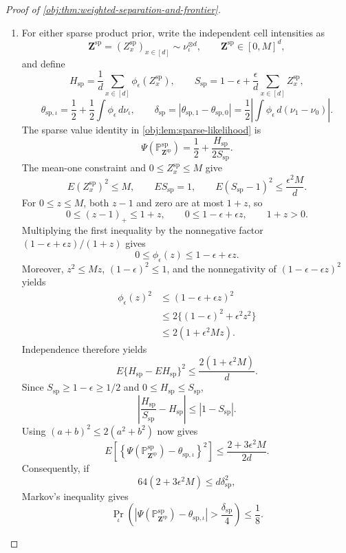 \documentclass[11pt]{article}
\begin{document}
\begin{proof}[Proof of \cref{obj:thm:weighted-separation-and-frontier}]
\begin{enumerate}
\item
For either sparse product prior, write the independent cell intensities as
\[
\mathbf Z^{\mathrm{sp}}
=(Z_x^{\mathrm{sp}})_{x\in[d]}
\sim\nu_\iota^{\otimes d},
\qquad
\mathbf Z^{\mathrm{sp}}\in[0,M]^d,
\]
and define
\[
H_{\mathrm{sp}}
=\frac1d\sum_{x\in[d]}\phi_\epsilon(Z_x^{\mathrm{sp}}),
\qquad
S_{\mathrm{sp}}
=1-\epsilon+\frac{\epsilon}{d}\sum_{x\in[d]}Z_x^{\mathrm{sp}},
\]
\[
\theta_{\mathrm{sp},\iota}
=\frac12+\frac12\int\phi_\epsilon\,d\nu_\iota,
\qquad
\delta_{\mathrm{sp}}
=|\theta_{\mathrm{sp},1}-\theta_{\mathrm{sp},0}|
=\frac12\left|\int\phi_\epsilon\,d(\nu_1-\nu_0)\right|.
\]
The sparse value identity in
\cref{obj:lem:sparse-likelihood} is
\[
\Psi(\mathbb P_{\mathbf Z^{\mathrm{sp}}}^{\mathrm{sp}})
=\frac12+\frac{H_{\mathrm{sp}}}{2S_{\mathrm{sp}}}.
\]
The mean-one constraint and \(0\le Z_x^{\mathrm{sp}}\le M\) give
\[
E (Z_x^{\mathrm{sp}})^2\le M,
\qquad
E S_{\mathrm{sp}}=1,
\qquad
E(S_{\mathrm{sp}}-1)^2\le\frac{\epsilon^2M}{d}.
\]
For \(0\le z\le M\), both \(z-1\) and zero are at most \(1+z\), so
\[
0\le(z-1)_+\le1+z,
\qquad
0\le1-\epsilon+\epsilon z,
\qquad
1+z>0.
\]
Multiplying the first inequality by the nonnegative factor
\((1-\epsilon+\epsilon z)/(1+z)\) gives
\[
0\le\phi_\epsilon(z)\le1-\epsilon+\epsilon z.
\]
Moreover, \(z^2\le Mz\), \((1-\epsilon)^2\le1\), and the nonnegativity of
\((1-\epsilon-\epsilon z)^2\) yields
\[
\begin{aligned}
\phi_\epsilon(z)^2
&\le(1-\epsilon+\epsilon z)^2\\
&\le2\{(1-\epsilon)^2+\epsilon^2z^2\}\\
&\le2(1+\epsilon^2Mz).
\end{aligned}
\]
Independence therefore yields
\[
E\{H_{\mathrm{sp}}-EH_{\mathrm{sp}}\}^2
\le\frac{2(1+\epsilon^2M)}d.
\]
Since \(S_{\mathrm{sp}}\ge1-\epsilon\ge1/2\) and
\(0\le H_{\mathrm{sp}}\le S_{\mathrm{sp}}\),
\[
\left|\frac{H_{\mathrm{sp}}}{S_{\mathrm{sp}}}
-H_{\mathrm{sp}}\right|
\le|1-S_{\mathrm{sp}}|.
\]
Using \((a+b)^2\le2(a^2+b^2)\) now gives
\[
E\left[
\left\{\Psi(\mathbb P_{\mathbf Z^{\mathrm{sp}}}^{\mathrm{sp}})
-\theta_{\mathrm{sp},\iota}\right\}^2
\right]
\le\frac{2+3\epsilon^2M}{2d}.
\]
Consequently, if
\[
64(2+3\epsilon^2M)\le d\delta_{\mathrm{sp}}^2,
\]
Markov's inequality gives
\[
\Pr_\iota\left(
\left|\Psi(\mathbb P_{\mathbf Z^{\mathrm{sp}}}^{\mathrm{sp}})
-\theta_{\mathrm{sp},\iota}\right|
>\frac{\delta_{\mathrm{sp}}}{4}
\right)\le\frac18.
\]


\end{enumerate}
\end{proof}
\end{document}
